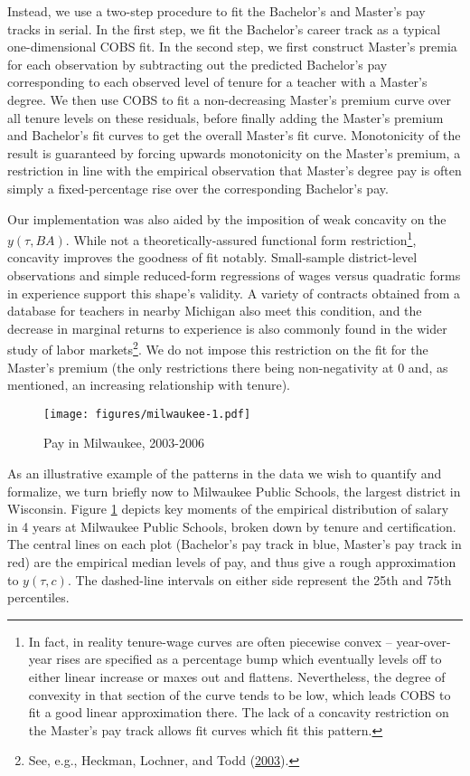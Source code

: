 \documentclass[12pt,]{article}
\let\rmarkdownfootnote\footnote%
\def\footnote{\protect\rmarkdownfootnote}
\begin{document}
Instead, we use a two-step procedure to fit the Bachelor's and Master's
pay tracks in serial. In the first step, we fit the Bachelor's career
track as a typical one-dimensional COBS fit. In the second step, we
first construct Master's premia for each observation by subtracting out
the predicted Bachelor's pay corresponding to each observed level of
tenure for a teacher with a Master's degree. We then use COBS to fit a
non-decreasing Master's premium curve over all tenure levels on these
residuals, before finally adding the Master's premium and Bachelor's fit
curves to get the overall Master's fit curve. Monotonicity of the result
is guaranteed by forcing upwards monotonicity on the Master's premium, a
restriction in line with the empirical observation that Master's degree
pay is often simply a fixed-percentage rise over the corresponding
Bachelor's pay.

Our implementation was also aided by the imposition of weak concavity on
the \(y(\tau, BA)\). While not a theoretically-assured functional form
restriction\footnote{In fact, in reality tenure-wage curves are often
  piecewise convex -- year-over-year rises are specified as a percentage
  bump which eventually levels off to either linear increase or maxes
  out and flattens. Nevertheless, the degree of convexity in that
  section of the curve tends to be low, which leads COBS to fit a good
  linear approximation there. The lack of a concavity restriction on the
  Master's pay track allows fit curves which fit this pattern.},
concavity improves the goodness of fit notably. Small-sample
district-level observations and simple reduced-form regressions of wages
versus quadratic forms in experience support this shape's validity. A
variety of contracts obtained from a database for teachers in nearby
Michigan also meet this condition, and the decrease in marginal returns
to experience is also commonly found in the wider study of labor
markets\footnote{See, e.g., Heckman, Lochner, and Todd
  (\protect\hyperlink{ref-heckman}{2003}).}. We do not impose this
restriction on the fit for the Master's premium (the only restrictions
there being non-negativity at 0 and, as mentioned, an increasing
relationship with tenure).

\begin{figure}[htbp]
\centering
\texttt{[image: figures/milwaukee-1.pdf]}
\caption{\label{fig:mwk}Pay in Milwaukee, 2003-2006}
\end{figure}

As an illustrative example of the patterns in the data we wish to
quantify and formalize, we turn briefly now to Milwaukee Public Schools,
the largest district in Wisconsin. Figure \ref{fig:mwk} depicts key
moments of the empirical distribution of salary in 4 years at Milwaukee
Public Schools, broken down by tenure and certification. The central
lines on each plot (Bachelor's pay track in blue, Master's pay track in
red) are the empirical median levels of pay, and thus give a rough
approximation to \(y(\tau, c)\). The dashed-line intervals on either
side represent the 25th and 75th percentiles.
\end{document}
